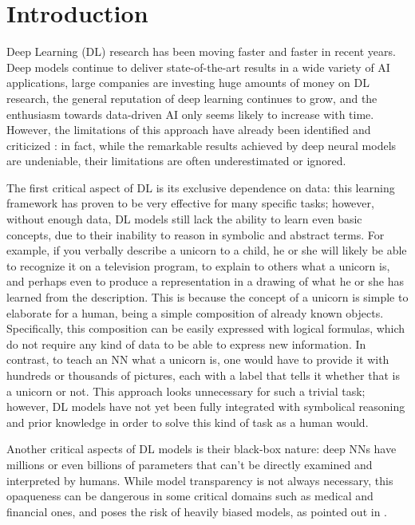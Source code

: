 \chapter{Introduction}
\label{introduction}

Deep Learning (DL) research has been moving faster and faster in recent years. Deep models continue to deliver state-of-the-art results in a wide variety of AI applications, large companies are investing huge amounts of money on DL research, the general reputation of deep learning continues to grow, and the enthusiasm towards data-driven AI only seems likely to increase with time. However, the limitations of this approach have already been identified and criticized \cite{marcus2018appraisal}: in fact, while the remarkable results achieved by deep neural models are undeniable, their limitations are often underestimated or ignored.

The first critical aspect of DL is its exclusive dependence on data: this learning framework has proven to be very effective for many specific tasks; however, without enough data, DL models still lack the ability to learn even basic concepts, due to their inability to reason in symbolic and abstract terms. For example, if you verbally describe a unicorn to a child, he or she will likely be able to recognize it on a television program, to explain to others what a unicorn is, \textcolor{unipd}{ and perhaps even to produce a representation in a drawing of what he or she has learned from the description}. This is because the concept of a unicorn is simple to elaborate for a human, being a simple composition of already known objects. Specifically, this composition can be easily expressed with logical formulas, which do not require any kind of data to be able to express new information.
In contrast, to teach an NN what a unicorn is, one would have to provide it with hundreds or thousands of pictures, each with a label that tells it whether that is a unicorn or not. This approach looks unnecessary for such a trivial task; however, DL models have not yet been fully integrated with symbolical reasoning and prior knowledge in order to solve this kind of task as a human would. 

Another critical aspects of DL models is their black-box nature: deep NNs have millions or even billions of parameters that can't be directly examined and interpreted by humans.
While model transparency is not always necessary, this opaqueness can be dangerous in some critical domains such as medical and financial ones, and poses the risk of heavily biased models, as pointed out in \cite{o2016weapons}.

